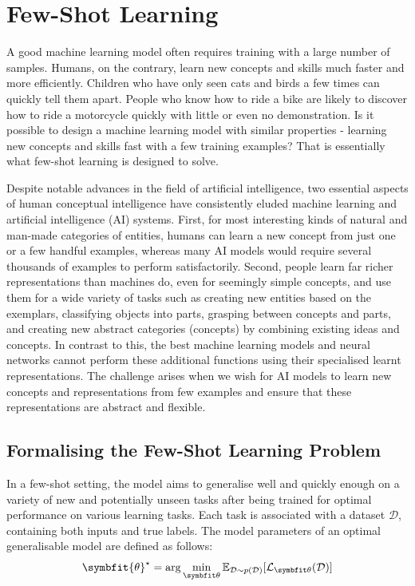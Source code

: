 \chapter{Few-Shot Learning}\label{chap:fsl}
A good machine learning model often requires training with a large number of samples. Humans, on the contrary, learn new concepts and skills much faster and more efficiently. Children who have only seen cats and birds a few times can quickly tell them apart. People who know how to ride a bike are likely to discover how to ride a motorcycle quickly with little or even no demonstration. Is it possible to design a machine learning model with similar properties - learning new concepts and skills fast with a few training examples? That is essentially what few-shot learning is designed to solve.

Despite notable advances in the field of artificial intelligence, two essential aspects of human conceptual intelligence have consistently eluded machine learning and artificial intelligence (AI) systems. 
First, for most interesting kinds of natural and man-made categories of entities, humans can learn a new concept from just one or a few handful examples, whereas many AI models would require several thousands of examples to perform satisfactorily. 
Second, people learn far richer representations than machines do, even for seemingly simple concepts, and use them for a wide variety of tasks such as creating new entities based on the exemplars, classifying objects into parts, grasping between concepts and parts, and creating new abstract categories (concepts) by combining existing ideas and concepts.
In contrast to this, the best machine learning models and neural networks cannot perform these additional functions using their specialised learnt representations. 
The challenge arises when we wish for AI models to learn new concepts and representations from few examples and ensure that these representations are abstract and flexible.

\section{Formalising the Few-Shot Learning Problem}\label{sec:formalising-fsl}

In a few-shot setting, the model aims to generalise well and quickly enough on a variety of new and potentially unseen tasks after being trained for optimal performance on various learning tasks.
Each task is associated with a dataset $\mathcal{D}$, containing both inputs and true labels. 
The model parameters of an optimal generalisable model are defined as follows:
\begin{equation}
    \symbfit{\theta}^\star = \arg\min_{\symbfit \theta} \mathbb{E}_{\mathcal{D}\sim p(\mathcal{D})} [\mathcal{L}_{\symbfit \theta}(\mathcal{D})]
\end{equation}

